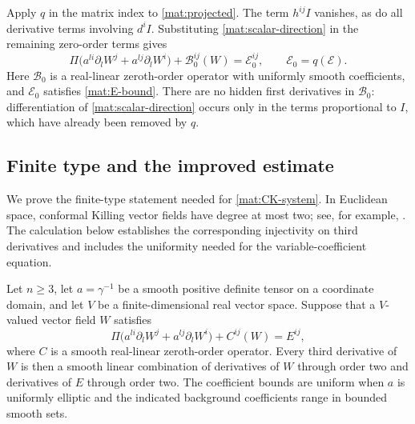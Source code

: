 Apply $q$ in the matrix index to \eqref{mat:projected}.  The term
$h^{ij}I$ vanishes, as do all derivative terms involving $d^iI$.
Substituting \eqref{mat:scalar-direction} in the remaining
zero-order terms gives
\begin{equation}
 \Pi\big(a^{li}\partial_lW^j+a^{lj}\partial_lW^i\big)
             +\mathcal B_0^{ij}(W)=\mathcal E_0^{ij},
 \qquad \mathcal E_0=q(\mathcal E).
 \label{mat:CK-system}
\end{equation}
Here $\mathcal B_0$ is a real-linear zeroth-order operator with
uniformly smooth coefficients, and $\mathcal E_0$ satisfies
\eqref{mat:E-bound}.  There are no hidden first derivatives in
$\mathcal B_0$: differentiation of \eqref{mat:scalar-direction}
occurs only in the terms proportional to $I$, which have already
been removed by $q$.

\subsection{Finite type and the improved estimate}

We prove the finite-type statement needed for
\eqref{mat:CK-system}.  In Euclidean space, conformal Killing vector
fields have degree at most two; see, for example,
\cite[Section~3]{Eastwood2005}.  The calculation below establishes the
corresponding injectivity on third derivatives and includes the
uniformity needed for the variable-coefficient equation.

\begin{lemma}
\label{mat:finite-type}
Let $n\ge3$, let $a=\gamma^{-1}$ be a smooth positive definite tensor
on a coordinate domain, and let $V$ be a finite-dimensional real vector
space.  Suppose that a $V$-valued vector field $W$ satisfies
\[
 \Pi\big(a^{li}\partial_lW^j+a^{lj}\partial_lW^i\big)
                          +C^{ij}(W)=E^{ij},
\]
where $C$ is a smooth real-linear zeroth-order operator.  Every third
derivative of $W$ is then a smooth linear combination of derivatives
of $W$ through order two and derivatives of $E$ through order two.
The coefficient bounds are uniform when $a$ is uniformly elliptic
and the indicated background coefficients range in bounded smooth
sets.
\end{lemma}

